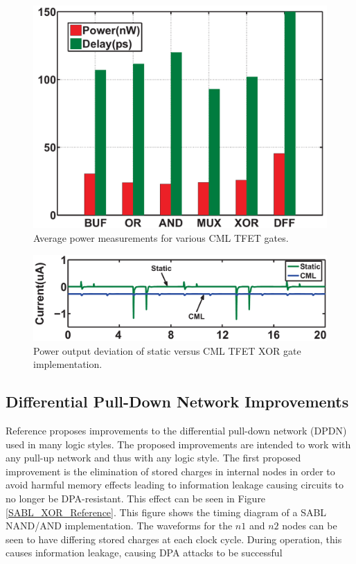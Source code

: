 \documentclass[conference, 12pt]{IEEEtran}
\newcommand{\x}{1}						%
\begin{document}
			\begin{figure}[tbp]
				\centering
				\includegraphics[width=\x\linewidth]{ReportFiles/TFET_CML_Power.png}
				\caption{Average power measurements for various CML TFET gates.\cite{b4}}
				\label{TFET_CML_Power}
			\end{figure}
			\begin{figure}[tbp]
				\centering
				\includegraphics[width=\x\linewidth]{ReportFiles/TFET_CML_XOR_Power.png}
				\caption{Power output deviation of static versus CML TFET XOR gate implementation.\cite{b4}}
				\label{TFET_CML_XOR_Power}
			\end{figure}

		\subsection{Differential Pull-Down Network Improvements}
			Reference \cite{b5} proposes improvements to the differential pull-down network (DPDN) used in many logic styles. The proposed improvements are intended to work with any pull-up network and thus with any logic style. The first proposed improvement is the elimination of stored charges in internal nodes in order to avoid harmful memory effects leading to information leakage causing circuits to no longer be DPA-resistant. This effect can be seen in Figure \ref{SABL_XOR_Reference}. This figure shows the timing diagram of a SABL NAND/AND implementation. The waveforms for the $n1$ and $n2$ nodes can be seen to have differing stored charges at each clock cycle. During operation, this causes information leakage, causing DPA attacks to be successful
\end{document}
